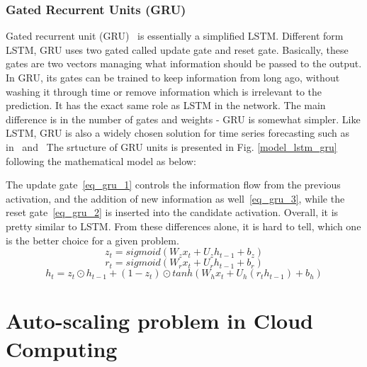 \documentclass[../main.tex]{subfiles}
\begin{document}
\subsubsection{Gated Recurrent Units (GRU)}

	Gated recurrent unit (GRU)~\cite{chung2014empirical} is essentially a simplified LSTM. Different form LSTM, GRU uses two gated called update gate and reset gate. Basically, these gates are two vectors managing what information should be passed to the output. In GRU, its gates can be trained to keep information from long ago, without washing it through time or remove information which is irrelevant to the prediction. It has the exact same role as LSTM in the network. The main difference is in the number of gates and weights - GRU is somewhat simpler. Like LSTM, GRU is also a widely chosen solution for time series forecasting such as in~\cite{langkvist2014review} and~\cite{bone2000recurrent} The srtucture of GRU units is presented in Fig. \ref{model_lstm_gru} following the mathematical model as below:
	
	The update gate~\ref{eq_gru_1} controls the information flow from the previous activation, and the addition of new information as well~\ref{eq_gru_3}, while the reset gate~\ref{eq_gru_2} is inserted into the candidate activation. Overall, it is pretty similar to LSTM. From these differences alone, it is hard to tell, which one is the better choice for a given problem. 
\begin{equation}\label{eq_gru_1}
z_t = sigmoid(W_zx_t + U_zh_{t−1} + b_z)
\end{equation}
\begin{equation}\label{eq_gru_2}
r_t = sigmoid(W_rx_t + U_rh_{t−1} + b_r)
\end{equation}
\begin{equation}\label{eq_gru_3}
h_t = z_t\odot h_{t-1} + (1 - z_t)\odot tanh(W_hx_t + U_h(r_th_{t-1}) + b_h)
\end{equation}

\section{Auto-scaling problem in Cloud Computing}
\label{sec:application}
\end{document}
